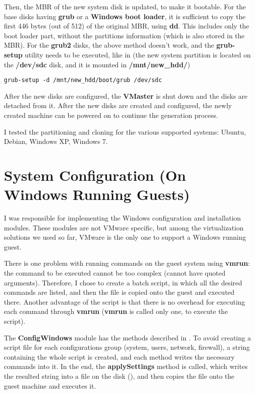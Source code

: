 Then, the MBR of the new system disk is updated, to make it bootable. For the
base disks having \textbf{grub} or a \textbf{Windows boot loader}, it is
sufficient to copy the first 446 bytes (out of 512) of the original MBR, using
\textbf{dd}. This includes only the boot loader part, without the partitions
information (which is also stored in the MBR). For the \textbf{grub2} disks,
the above method doesn't work, and the \textbf{grub-setup} utility needs to be
executed, like in  (the new system
partition is located on the \textbf{/dev/sdc} disk, and it is mounted in
\textbf{/mnt/new\_hdd/})

\lstset{caption=configuring grub2,label=lst:mbr-grub2}
\begin{lstlisting}
grub-setup -d /mnt/new_hdd/boot/grub /dev/sdc
\end{lstlisting}

After the new disks are configured, the \textbf{VMaster} is shut down and the
disks are detached from it. After the new disks are created and configured, the
newly created machine can be powered on to continue the generation process.

I tested the partitioning and cloning for the various supported systems:
Ubuntu, Debian, Windows XP, Windows 7.


\section{System Configuration (On Windows Running Guests)}
\label{sec:vmware-config}
I was responsible for implementing the Windows configuration and installation
modules. These modules are not VMware specific, but among the virtualization
solutions we used so far, VMware is the only one to support a Windows running
guest.

There is one problem with running commands on the guest system using
\textbf{vmrun}: the command to be executed cannot be too complex (cannot have
quoted arguments). Therefore, I chose to create a batch script, in which all
the desired commands are listed, and then the file is copied onto the guest and
executed there. Another advantage of the script is that there is no overhead
for executing each command through \textbf{vmrun} (\textbf{vmrun} is called
only one, to execute the script).

The \textbf{ConfigWindows} module has the methods described in
. To avoid creating a script file
for each configurations group (system, users, network, firewall), a string
containing the whole script is created, and each method writes the necessary
commands into it. In the end, the \textbf{applySettings} method is called,
which writes the resulted string into a file on the disk (),
and then copies the file onto the guest machine and executes it.

